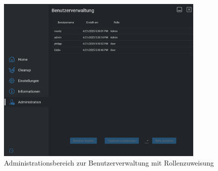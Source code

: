 \begin{figure}[H]
    \centering
    \includegraphics[width=0.9\textwidth]{src/screenshot_admin.png}
    \caption{Administrationsbereich zur Benutzerverwaltung mit Rollenzuweisung}
\end{figure}
